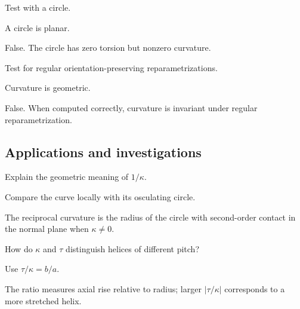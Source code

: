 \begin{exercise}\label{exr:vii13-ped-11}
Test with a circle.
\end{exercise}
\begin{hint}
A circle is planar.
\end{hint}
\begin{solution}
False.  The circle has zero torsion but nonzero curvature.
\end{solution}

\begin{exercise}\label{exr:vii13-ped-12}
Test for regular orientation-preserving reparametrizations.
\end{exercise}
\begin{hint}
Curvature is geometric.
\end{hint}
\begin{solution}
False.  When computed correctly, curvature is invariant under regular reparametrization.
\end{solution}

\subsection*{Applications and investigations}

\begin{exercise}\label{exr:vii13-ped-13}
Explain the geometric meaning of \(1/\kappa\).
\end{exercise}
\begin{hint}
Compare the curve locally with its osculating circle.
\end{hint}
\begin{solution}
The reciprocal curvature is the radius of the circle with second-order contact in the normal plane when \(\kappa\neq0\).
\end{solution}

\begin{exercise}\label{exr:vii13-ped-14}
How do \(\kappa\) and \(\tau\) distinguish helices of different pitch?
\end{exercise}
\begin{hint}
Use \(\tau/\kappa=b/a\).
\end{hint}
\begin{solution}
The ratio measures axial rise relative to radius; larger \(|\tau/\kappa|\) corresponds to a more stretched helix.
\end{solution}

